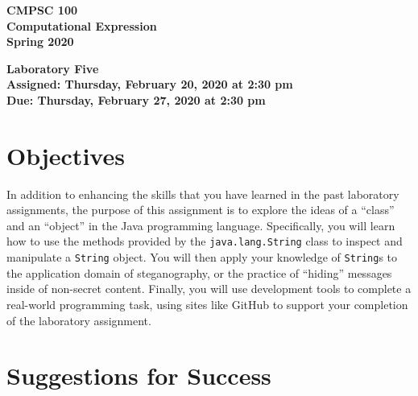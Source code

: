 \documentclass[11pt]{article}
\newcommand{\assignmentduedate}{February 27}
\newcommand{\assignmentassignedate}{February 20}
\newcommand{\assignmentnumber}{Five}
\newcommand{\labyear}{2020}
\newcommand{\labday}{Thursday}
\newcommand{\labdueday}{Thursday}
\newcommand{\labtime}{2:30 pm}
\newcommand{\assigneddate}{Assigned: \labday, \assignmentassignedate, \labyear{} at \labtime{}}
\newcommand{\duedate}{Due: \labdueday, \assignmentduedate, \labyear{} at \labtime{}}
\newcommand{\labtitle}[1]
{
  \begin{center}
    \begin{center}
      \bf
      CMPSC 100\\Computational Expression\\
      Spring 2020\\
      \medskip
    \end{center}
    \bf
    #1
  \end{center}
}
\begin{document}
\thispagestyle{empty}

\labtitle{Laboratory \assignmentnumber{} \\ \assigneddate{} \\ \duedate{}}

\section*{Objectives}

In addition to enhancing the skills that you have learned in the past laboratory
assignments, the purpose of this assignment is to explore the ideas of a
``class'' and an ``object'' in the Java programming language. Specifically, you
will learn how to use the methods provided by the {\tt java.lang.String} class
to inspect and manipulate a {\tt String} object. You will then apply your
knowledge of {\tt String}s to the application domain of steganography, or the
practice of ``hiding'' messages inside of non-secret content. Finally, you will
use development tools to complete a real-world programming task, using sites
like GitHub to support your completion of the laboratory assignment.

\section*{Suggestions for Success}
\end{document}
